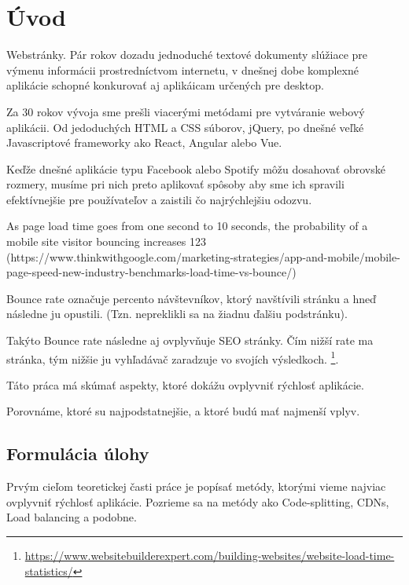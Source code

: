 
{}

\chapter*{Úvod}
Webstránky. Pár rokov dozadu jednoduché textové dokumenty slúžiace pre výmenu informácii prostredníctvom internetu, v dnešnej dobe komplexné aplikácie schopné konkurovať aj aplikáicam určených pre desktop.

Za 30 rokov vývoja sme prešli viacerými metódami pre vytváranie webový aplikácii. Od jedoduchých HTML a CSS súborov, jQuery, po dnešné veľké Javascriptové frameworky ako React, Angular alebo Vue.

Keďže dnešné aplikácie typu Facebook alebo Spotify môžu dosahovať obrovské rozmery, musíme pri nich preto aplikovať spôsoby aby sme ich spravili efektívnejšie pre používateľov a zaistili čo najrýchlejšiu odozvu. 

As page load time goes from one second to 10 seconds, the probability of a mobile site visitor bouncing increases 123%
(https://www.thinkwithgoogle.com/marketing-strategies/app-and-mobile/mobile-page-speed-new-industry-benchmarks-load-time-vs-bounce/)

Bounce rate označuje percento návštevníkov, ktorý navštívili stránku a hneď následne ju opustili. (Tzn. nepreklikli sa na žiadnu ďalšiu podstránku).

Takýto Bounce rate následne aj ovplyvňuje SEO stránky. Čím nižší rate ma stránka, tým nižšie ju vyhľadávač zaradzuje vo svojích výsledkoch.
\footnote{\url{https://www.websitebuilderexpert.com/building-websites/website-load-time-statistics/}}.

Táto práca má skúmať aspekty, ktoré dokážu ovplyvniť rýchlosť aplikácie. 

Porovnáme, ktoré su najpodstatnejšie, a ktoré budú mať najmenší vplyv.


\section*{Formulácia úlohy}

Prvým cieľom teoretickej časti práce je popísať metódy, ktorými vieme najviac ovplyvniť rýchlosť aplikácie. Pozrieme sa na metódy ako Code-splitting, CDNs, Load balancing a podobne.

